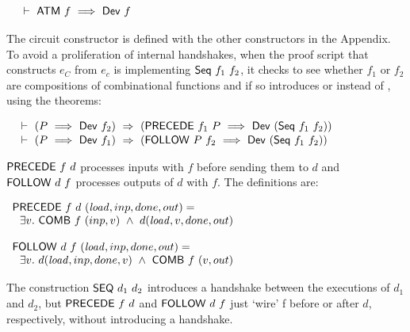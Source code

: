 \documentclass{llncs}
\begin{document}
\vspace*{-4mm}
$$\begin{array}{l}
~\vdash\ \mathsf{ATM}\ f\ \Longrightarrow \  \mathsf{Dev}\ f\\
\phantom{~~~~~~~~~~~~~~~~~~~~~~~~~~~~~~~~~~~~~~~~~~~~~~~~~~~~~~~~~~~~~~~~~~~~~~~~~~~~~~~~~~~~~~~~~~~~~~~~~~~~~}\\[-4mm]
\end{array}$$

\noindent The circuit constructor  is defined with the other constructors in the Appendix.
To avoid a proliferation  of internal handshakes, when the proof script that constructs $e_C$ from $e_c$ 
is implementing $\mathsf{Seq}~f_1~f_2$, it checks to see whether $f_1$ or $f_2$ 
are compositions of combinational functions and if so introduces  or  instead of ,
using the theorems:

\vspace*{-4mm}
$$\begin{array}{l}
~\vdash\
      (P\ \Longrightarrow\ \mathsf{Dev}~f_2)~\Rightarrow~(\mathsf{PRECEDE}~f_1~P\ \Longrightarrow\ \mathsf{Dev}\ (\mathsf{Seq}~f_1~f_2))\\
\phantom{~~~~~~~~~~~~~~~~~~~~~~~~~~~~~~~~~~~~~~~~~~~~~~~~~~~~~~~~~~~~~~~~~~~~~~~~~~~~~~~~~~~~~~~~~~~~~~~~~~~~~~}\\[-4mm]
~\vdash\
(P\ \Longrightarrow\ \mathsf{Dev}~f_1)~\Rightarrow~(\mathsf{FOLLOW}~P~f_2\  \Longrightarrow\ \mathsf{Dev}\ (\mathsf{Seq}~f_1~f_2))\\
\end{array}$$


\noindent $\mathsf{PRECEDE}~f~d$ processes inputs with $f$ before sending them to $d$ and
$\mathsf{FOLLOW}~d~f$ processes outputs of $d$ with
$f$. The definitions are:

\vspace*{3mm}

$\begin{array}{l}
\mathsf{PRECEDE}~f~d~(\mathit{load},inp,done,out)  =\\
~~ \exists v.~ \mathsf{COMB}~f~(inp,v) ~\wedge~ d(\mathit{load},v,done,out)\\
 \\
\mathsf{FOLLOW}~d~f~ (\mathit{load},inp,done,out)  =\\
~~ \exists v.~d(\mathit{load},inp,done,v) ~\wedge~ \mathsf{COMB}~f~(v,out)
\end{array}$
\vspace*{3mm}

The construction $\mathsf{SEQ}~d_1~d_2$ introduces a handshake between the executions
of $d_1$ and $d_2$, but $\mathsf{PRECEDE}~f~d$ and $\mathsf{FOLLOW}~d~f$
just `wire' f before or after $d$, respectively, without introducing a
handshake. 
\end{document}
